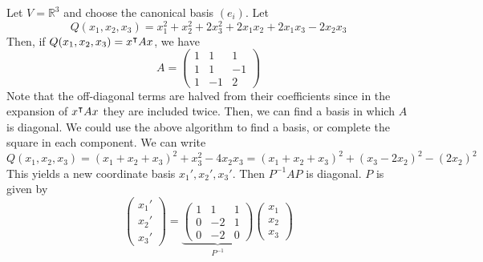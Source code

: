 \begin{example}
	Let \( V = \mathbb R^3 \) and choose the canonical basis \( (e_i) \).
	Let
	\[
		Q(x_1, x_2, x_3) = x_1^2 + x_2^2 + 2x_3^2 + 2x_1 x_2 + 2x_1 x_3 - 2x_2 x_3
	\]
	Then, if \( Q(x_1, x_2, x_3) = x^\intercal A x \), we have
	\[
		A = \begin{pmatrix}
			1 & 1  & 1  \\
			1 & 1  & -1 \\
			1 & -1 & 2
		\end{pmatrix}
	\]
	Note that the off-diagonal terms are halved from their coefficients since in the expansion of \( x^\intercal A x \) they are included twice.
	Then, we can find a basis in which \( A \) is diagonal.
	We could use the above algorithm to find a basis, or complete the square in each component.
	We can write
	\[
		Q(x_1, x_2, x_3) = (x_1 + x_2 + x_3)^2 + x_3^2 - 4 x_2 x_3 = (x_1 + x_2 + x_3)^2 + (x_3 - 2x_2)^2 - (2x_2)^2
	\]
	This yields a new coordinate basis \( x_1', x_2', x_3' \).
	Then \( P^{-1} A P \) is diagonal.
	\( P \) is given by
	\[
		\begin{pmatrix} x_1' \\ x_2' \\ x_3' \end{pmatrix} = \underbrace{\begin{pmatrix} 1 & 1 & 1 \\ 0 & -2 & 1 \\ 0 & -2 & 0 \end{pmatrix}}_{P^{-1}} \begin{pmatrix} x_1 \\ x_2 \\ x_3 \end{pmatrix}
	\]
\end{example}

